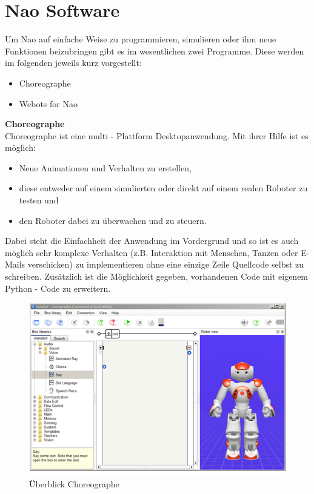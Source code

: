 \section{Nao Software}
Um Nao auf einfache Weise zu programmieren, simulieren oder ihm neue Funktionen beizubringen gibt es im wesentlichen zwei Programme. Diese werden im folgenden jeweils kurz vorgestellt:

\begin{itemize}
\item Choreographe
\item Webots for Nao
\end{itemize}
\textbf{Choreographe} 
\\
Choreographe ist eine multi - Plattform Desktopanwendung. Mit ihrer Hilfe ist es möglich:
\begin{itemize}
\item Neue Animationen und Verhalten zu erstellen,
\item diese entweder auf einem simulierten  oder direkt auf einem realen Roboter zu testen und
\item den Roboter dabei zu überwachen und zu steuern.
\end{itemize}
Dabei steht die Einfachheit der Anwendung im Vordergrund und so ist es auch möglich sehr komplexe Verhalten (z.B. Interaktion mit Menschen, Tanzen oder E-Mails verschicken) zu implementieren ohne eine einzige Zeile Quellcode selbst zu schreiben. Zusätzlich ist die Möglichkeit gegeben, vorhandenen Code mit eigenem Python - Code zu erweitern.

\begin{figure}[H]						
	\centering							
	\includegraphics[scale=1.0]{Bilder/choreographe.png}			
	\caption{Überblick Choreographe}						
	\label{f:nao_choreographe}						
\end{figure}

